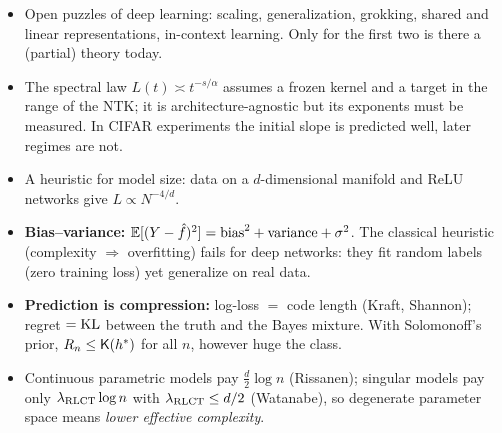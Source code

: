 \begin{takeaways}
\begin{itemize}
  \item Open puzzles of deep learning: scaling, generalization, grokking, shared and linear representations, in-context learning. Only for the first two is there a (partial) theory today.
  \item The spectral law $L(t)\asymp t^{-s/\alpha}$ assumes a frozen kernel and a target in the range of the NTK; it is architecture-agnostic but its exponents must be measured. In CIFAR experiments the initial slope is predicted well, later regimes are not.
  \item A heuristic for model size: data on a $d$-dimensional manifold and ReLU networks give $L\propto N^{-4/d}$.
  \item \textbf{Bias--variance:} $\mathbb{E}[(Y-\hat f)^2]=\text{bias}^2+\text{variance}+\sigma^2$. The classical heuristic (complexity $\Rightarrow$ overfitting) fails for deep networks: they fit random labels (zero training loss) yet generalize on real data.
  \item \textbf{Prediction is compression:} log-loss $=$ code length (Kraft, Shannon); regret $=\operatorname{KL}$ between the truth and the Bayes mixture. With Solomonoff's prior, $R_n\le\mathsf{K}(h^*)$ for all $n$, however huge the class.
  \item Continuous parametric models pay $\tfrac d2\log n$ (Rissanen); singular models pay only $\lambda_{\mathrm{RLCT}}\log n$ with $\lambda_{\mathrm{RLCT}}\le d/2$ (Watanabe), so degenerate parameter space means \emph{lower effective complexity}.
\end{itemize}
\end{takeaways}

